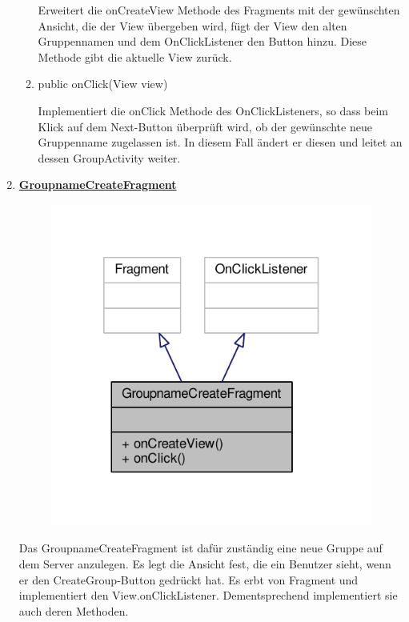 \begin{enumerate}
\begin{enumerate}
		Erweitert die onCreateView Methode des Fragments mit der gewünschten Ansicht, die der View übergeben wird, fügt der View den alten Gruppennamen und dem OnClickListener den Button hinzu. Diese Methode gibt die aktuelle View zurück.
		
		\item public onClick(View view)
		
		Implementiert die onClick Methode des OnClickListeners, so dass beim Klick auf dem Next-Button überprüft wird, ob der gewünschte neue Gruppenname zugelassen ist. In diesem Fall ändert er diesen und leitet an dessen GroupActivity weiter.
	\end{enumerate}

	\item \textbf{\underline{GroupnameCreateFragment}}
	
	\begin{figure}[H]
		\includegraphics[scale = 1]{res/create_fragment__inherit__graph.pdf}
		\centering
	\end{figure}
	Das GroupnameCreateFragment ist dafür zuständig eine neue Gruppe auf dem Server anzulegen. Es legt die Ansicht fest, die ein Benutzer sieht, wenn er den CreateGroup-Button gedrückt hat. Es erbt von Fragment und implementiert den View.onClickListener. Dementsprechend implementiert sie auch deren Methoden.
	

\end{enumerate}
